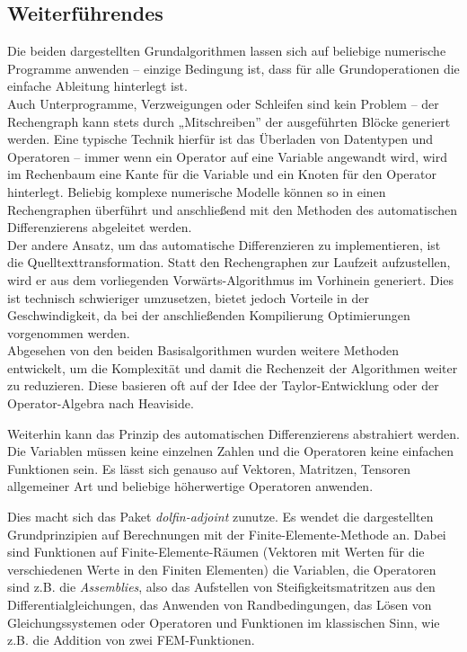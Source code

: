\documentclass{scrartcl}
\begin{document}
\subsection{Weiterführendes}
Die beiden dargestellten Grundalgorithmen lassen sich auf beliebige numerische Programme anwenden -- einzige Bedingung ist, dass für alle Grundoperationen die einfache Ableitung hinterlegt ist.\\
Auch Unterprogramme, Verzweigungen oder Schleifen sind kein Problem -- der Rechengraph kann stets durch „Mitschreiben” der ausgeführten Blöcke generiert werden. Eine typische Technik hierfür ist das Überladen von Datentypen und Operatoren -- immer wenn ein Operator auf eine Variable angewandt wird, wird im Rechenbaum eine Kante für die Variable und ein Knoten für den Operator hinterlegt. Beliebig komplexe numerische Modelle können so in einen Rechengraphen überführt und anschließend mit den Methoden des automatischen Differenzierens abgeleitet werden.\\
Der andere Ansatz, um das automatische Differenzieren zu implementieren, ist die Quelltexttransformation. Statt den Rechengraphen zur Laufzeit aufzustellen, wird er aus dem vorliegenden Vorwärts-Algorithmus im Vorhinein generiert. Dies ist technisch schwieriger umzusetzen, bietet jedoch Vorteile in der Geschwindigkeit, da bei der anschließenden Kompilierung Optimierungen vorgenommen werden.\\
Abgesehen von den beiden Basisalgorithmen wurden weitere Methoden entwickelt, um die Komplexität und damit die Rechenzeit der Algorithmen weiter zu reduzieren. Diese basieren oft auf der Idee der Taylor-Entwicklung oder der Operator-Algebra nach Heaviside.
\par Weiterhin kann das Prinzip des automatischen Differenzierens abstrahiert werden. Die Variablen müssen keine einzelnen Zahlen und die Operatoren keine einfachen Funktionen sein. Es lässt sich genauso auf Vektoren, Matritzen, Tensoren allgemeiner Art und beliebige höherwertige Operatoren anwenden.\par
Dies macht sich das Paket \emph{dolfin-adjoint} zunutze. Es wendet die dargestellten Grundprinzipien auf Berechnungen mit der Finite-Elemente-Methode an. Dabei sind Funktionen auf Finite-Elemente-Räumen (Vektoren mit Werten für die verschiedenen Werte in den Finiten Elementen) die Variablen, die Operatoren sind z.B. die \emph{Assemblies}, also das Aufstellen von Steifigkeitsmatritzen aus den Differentialgleichungen, das Anwenden von Randbedingungen, das Lösen von Gleichungssystemen oder Operatoren und Funktionen im klassischen Sinn, wie z.B. die Addition von zwei FEM-Funktionen.\\
\end{document}
